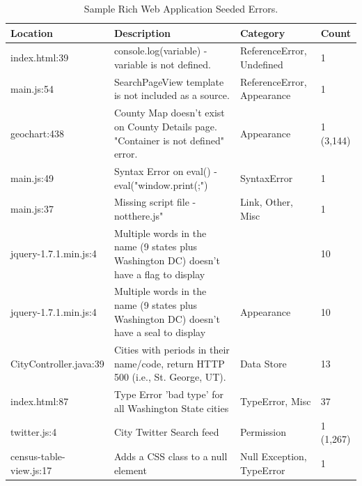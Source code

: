 \begin{table}[h]
	\centering
	\caption{Sample Rich Web Application Seeded Errors.}
	\begin{tabular}{| l | p{5cm} | p{3cm} | l |}
		\hline

Location    &    Description    &    Category    &    Count		\\ \hline

index.html:39 	&
console.log(variable) - variable is not defined.  & 
ReferenceError, Undefined& 
1 
\\ \hline

main.js:54	& 
SearchPageView template is not included as a source.  & 
ReferenceError, Appearance&
1 
\\ \hline

geochart:438& 
County Map doesn't exist on County Details page. "Container is not defined" error.  & 
Appearance& 
1 (3,144)
\\ \hline

main.js:49&
Syntax Error on eval() - eval("window.print(;") & 
SyntaxError & 
1 
\\ \hline

main.js:37& 
Missing script file - notthere.js"  & 
Link, Other, Misc& 
1 
\\ \hline

jquery-1.7.1.min.js:4 & 
Multiple words in the name (9 states plus Washington DC) doesn't have a flag to display & 
& 
10 
\\ \hline

jquery-1.7.1.min.js:4 & 
Multiple words in the name (9 states plus Washington DC) doesn't have a seal to display & 
Appearance& 
10 
\\ \hline

CityController.java:39&
Cities with periods in their name/code, return HTTP 500 (i.e., St. George, UT). & 
Data Store & 
13 
\\ \hline

index.html:87& 
Type Error 'bad type' for all Washington State cities & 
TypeError, Misc& 
37 
\\ \hline

twitter.js:4& 
City Twitter Search feed & 
Permission & 
1 (1,267)
\\ \hline

census-table-view.js:17& 
Adds a CSS class to a null element& 
Null Exception, TypeError & 
1
\\ \hline

	\end{tabular}
\label{table:seededExceptions}
\end{table}

